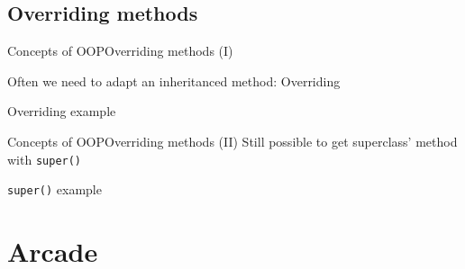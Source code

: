 \documentclass[10pt,compress]{beamer} %
\begin{document}
\subsection{Overriding methods}

\begin{frame}{Concepts of OOP}{Overriding methods (I)}

	Often we need to adapt an inheritanced method: \alert{Overriding}

	\begin{block}{Overriding example}
		\vspace{-0.2cm}
		
		\vspace{-0.2cm}
	\end{block}
\end{frame}
	
\begin{frame}{Concepts of OOP}{Overriding methods (II)}
		Still possible to get superclass' method with \texttt{super()}

	\begin{block}{\texttt{super()} example}
		\vspace{-0.2cm}
		
		\vspace{-0.2cm}
	\end{block}
\end{frame}

\section{Arcade}

\begin{frame}[plain]
	\begin{exampleblock}{}
		\vspace{-0.2cm}
		
		\vspace{-0.2cm}
	\end{exampleblock}
\end{frame}

\begin{frame}[plain]
	\begin{exampleblock}{}
		\vspace{-0.2cm}
		
		\vspace{-0.2cm}
	\end{exampleblock}
\end{frame}
\end{document}
